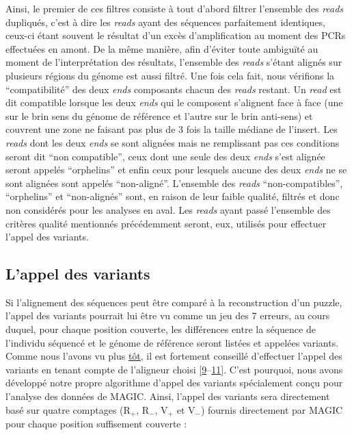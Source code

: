 \documentclass[12pt,twoside]{ugathesis}
\begin{document}
Ainsi, le premier de ces filtres consiste à tout d'abord filtrer
l'ensemble des \emph{reads} dupliqués, c'est à dire les \emph{reads}
ayant des séquences parfaitement identiques, ceux-ci étant souvent le
résultat d'un excès d'amplification au moment des PCRs effectuées en
amont. De la même manière, afin d'éviter toute ambiguïté au moment de
l'interprétation des résultats, l'ensemble des \emph{reads} s'étant
alignés sur plusieurs régions du génome est aussi filtré. Une fois cela
fait, nous vérifions la ``compatibilité'' des deux \emph{ends}
composants chacun des \emph{reads} restant. Un \emph{read} est dit
compatible lorsque les deux \emph{ends} qui le composent s'alignent face
à face (une sur le brin sens du génome de référence et l'autre sur le
brin anti-sens) et couvrent une zone ne faisant pas plus de 3 fois la
taille médiane de l'insert. Les \emph{reads} dont les deux \emph{ends}
se sont alignées mais ne remplissant pas ces conditions seront dit ``non
compatible'', ceux dont une seule des deux \emph{ends} s'est alignée
seront appelés ``orphelins'' et enfin ceux pour lesquels aucune des deux
\emph{ends} ne se sont alignées sont appelés ``non-aligné''. L'ensemble
des \emph{reads} ``non-compatibles'', ``orphelins'' et ``non-alignés''
sont, en raison de leur faible qualité, filtrés et donc non considérés
pour les analyses en aval. Les \emph{reads} ayant passé l'ensemble des
critères qualité mentionnés précédemment seront, eux, utilisés pour
effectuer l'appel des variants.

\newpage

\subsection{L'appel des variants}\label{lappel-des-variants}

Si l'alignement des séquences peut être comparé à la reconstruction d'un
puzzle, l'appel des variants pourrait lui être vu comme un jeu des 7
erreurs, au cours duquel, pour chaque position couverte, les différences
entre la séquence de l'individu séquencé et le génome de référence
seront listées et appelées variants. Comme nous l'avons vu plus
\protect\hyperlink{varcall}{tôt}, il est fortement conseillé d'effectuer
l'appel des variants en tenant compte de l'aligneur choisi
{[}\protect\hyperlink{ref-Nielsen2011}{9}--\protect\hyperlink{ref-Lunter2011}{11}{]}.
C'est pourquoi, nous avons développé notre propre algorithme d'appel des
variants spécialement conçu pour l'analyse des données de MAGIC. Ainsi,
l'appel des variants sera directement basé sur quatre comptages
(R\(_+\), R\(_-\), V\(_+\) et V\(_-\)) fournis directement par MAGIC
pour chaque position suffisement couverte :
\end{document}
